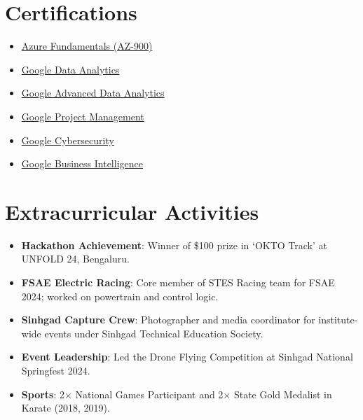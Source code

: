 \documentclass[letterpaper,11pt]{article}
\newcommand{\resumeItem}[2]{\item\small{\textbf{#1}{: #2 \vspace{-2pt}}}}
\newcommand{\resumeSubHeadingListStart}{\begin{itemize}[leftmargin=*]}
\newcommand{\resumeSubHeadingListEnd}{\end{itemize}}
\begin{document}
\section{Certifications}
\vspace{-10pt}
\begin{multicols}{3}
\begin{itemize}[leftmargin=*, itemsep=2pt, parsep=0pt]
  \item \href{https://github.com/LitZeus/certificates/blob/main/Azure_certification.pdf}{Azure Fundamentals (AZ-900)}
  \item \href{https://github.com/LitZeus/certificates/blob/main/google-data-analytics-cert.pdf}{Google Data Analytics}
  \item \href{https://github.com/LitZeus/certificates/blob/main/google-advanced-data-analytics-cert.pdf}{Google Advanced Data Analytics}
  \item \href{https://github.com/LitZeus/certificates/blob/main/google-project-management-cert.pdf}{Google Project Management}
  \item \href{https://github.com/LitZeus/certificates/blob/main/Google%20Cybersecurity%20Professional%20Certificate.pdf}{Google Cybersecurity}
  \item \href{https://github.com/LitZeus/certificates/blob/main/google-business-intelligence-cert.pdf}{Google Business Intelligence}
\end{itemize}
\end{multicols}

\section{Extracurricular Activities}
\resumeSubHeadingListStart
  \resumeItem{Hackathon Achievement}{Winner of \$100 prize in ‘OKTO Track’ at UNFOLD 24, Bengaluru.}
  \resumeItem{FSAE Electric Racing}{Core member of STES Racing team for FSAE 2024; worked on powertrain and control logic.}
  \resumeItem{Sinhgad Capture Crew}{Photographer and media coordinator for institute-wide events under Sinhgad Technical Education Society.}
  \resumeItem{Event Leadership}{Led the Drone Flying Competition at Sinhgad National Springfest 2024.}
  \resumeItem{Sports}{2× National Games Participant and 2× State Gold Medalist in Karate (2018, 2019).}
\resumeSubHeadingListEnd
\end{document}
